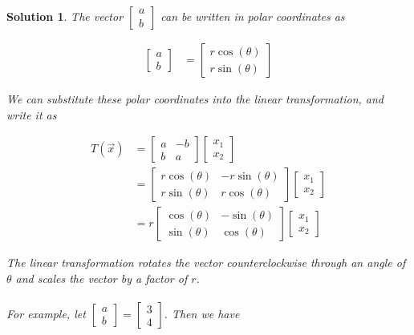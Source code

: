\documentclass{article}
\newtheorem*{solution}{Solution}
\begin{document}
\begin{solution}
The vector $\begin{bmatrix} a \\ b \end{bmatrix}$ can be written in polar coordinates as

\begin{align*}
\begin{bmatrix} a \\ b \end{bmatrix} &= \begin{bmatrix} r \cos(\theta) \\ r \sin(\theta) \end{bmatrix}
\end{align*}

We can substitute these polar coordinates into the linear transformation, and write it as

\begin{align*}
T(\vec{x}) &= \begin{bmatrix}a & -b \\ b & a \end{bmatrix} \begin{bmatrix} x_{1} \\ x_{2} \end{bmatrix} \\
		&= \begin{bmatrix}r \cos(\theta) & -r \sin(\theta) \\ r \sin(\theta) & r \cos(\theta) \end{bmatrix} \begin{bmatrix} x_{1} \\ x_{2} \end{bmatrix} \\
		&= r \begin{bmatrix} \cos(\theta) & -\sin(\theta) \\ \sin(\theta) & \cos(\theta) \end{bmatrix} \begin{bmatrix} x_{1} \\ x_{2} \end{bmatrix} 
\end{align*}

The linear transformation rotates the vector counterclockwise through an angle of $\theta$ and scales the vector by a factor of $r$. 
\\ 
\\
For example, let $\begin{bmatrix} a \\ b \end{bmatrix} = \begin{bmatrix} 3 \\ 4 \end{bmatrix}$. Then we have


\end{solution}
\end{document}
